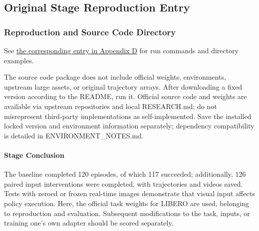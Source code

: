\subsection{Original Stage Reproduction Entry}\label{s08-detail-9}

\subsubsection{Reproduction and Source Code Directory}\label{s08-detail-10}

\noindent See \hyperlink{s08-command-1}{the corresponding entry in Appendix D} for run commands and directory examples.\par

The source code package does not include official weights, environments, upstream large assets, or original trajectory arrays. After downloading a fixed version according to the README, run it. Official source code and weights are available via upstream repositories and local RESEARCH.md; do not misrepresent third-party implementations as self-implemented. Save the installed locked version and environment information separately; dependency compatibility is detailed in ENVIRONMENT\_NOTES.md.


\paragraph{Stage Conclusion} The baseline completed 120 episodes, of which 117 succeeded; additionally, 126 paired input interventions were completed, with trajectories and videos saved. Tests with zeroed or frozen real-time images demonstrate that visual input affects policy execution. Here, the official task weights for LIBERO are used, belonging to reproduction and evaluation. Subsequent modifications to the task, inputs, or training one's own adapter should be scored separately.


\FloatBarrier
